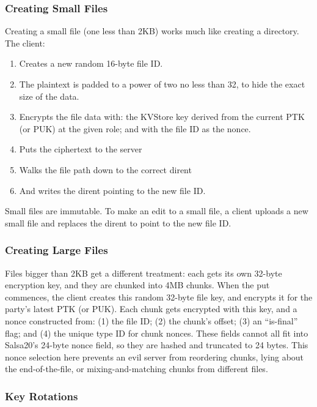 \subsubsection{Creating Small Files}

Creating a small file (one less than 2KB) works much like creating a directory. The client:
%
\begin{enumerate}
    \item Creates a new random 16-byte file ID. 
    \item The plaintext is padded to a power of two no less than 32, to hide the exact size of the data.
    \item Encrypts the file data with: the KVStore key derived from the 
         current PTK (or PUK) at the given role; and with the file ID as the nonce.
    \item Puts the ciphertext to the server
    \item Walks the file path down to the correct dirent
    \item And writes the dirent pointing to the new file ID.
\end{enumerate}
%
Small files are immutable. To make an edit to a small file, a client uploads a new 
small file and replaces the dirent to point to the new file ID.


\subsubsection{Creating Large Files}

Files bigger than 2KB get a different treatment: each gets its own 32-byte encryption
key, and they are chunked into 4MB chunks. When the put commences, the client
creates this random 32-byte file key, and encrypts it for the party's latest
PTK (or PUK). Each chunk gets encrypted with this key, and a nonce constructed 
from: (1) the file ID; (2) the chunk's offset; (3) an ``is-final'' flag;
and (4) the unique type ID for chunk nonces. These fields cannot all fit into
Salsa20's 24-byte nonce field, so they are hashed and truncated to 24 bytes.
This nonce selection here prevents an evil server from reordering chunks,
lying about the end-of-the-file, or mixing-and-matching chunks from different
files.

\subsubsection{Key Rotations}
\label{sec:kv:rotations}

